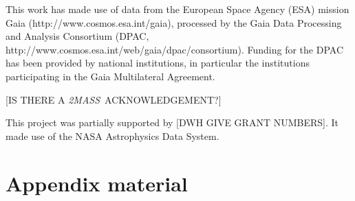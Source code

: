 \documentclass[12pt, preprint]{aastex6}
\newcommand{\acronym}[1]{{\small{#1}}}
\newcommand{\project}[1]{\textsl{#1}}
\newcommand{\tmass}{\project{\acronym{2MASS}}}
\begin{document}
This work has made use of data from the European Space Agency (\acronym{ESA})
mission Gaia (http://www.cosmos.esa.int/gaia), processed by the Gaia
Data Processing and Analysis Consortium (\acronym{DPAC},
http://www.cosmos.esa.int/web/gaia/dpac/consortium). Funding for the
\acronym{DPAC} has been provided by national institutions, in particular the
institutions participating in the Gaia Multilateral Agreement.

[IS THERE A \tmass\ ACKNOWLEDGEMENT?]

This project was partially supported by [DWH GIVE GRANT NUMBERS]. It
made use of the \acronym{NASA} Astrophysics Data System.

\appendix

\section{Appendix material}



\clearpage
\end{document}
